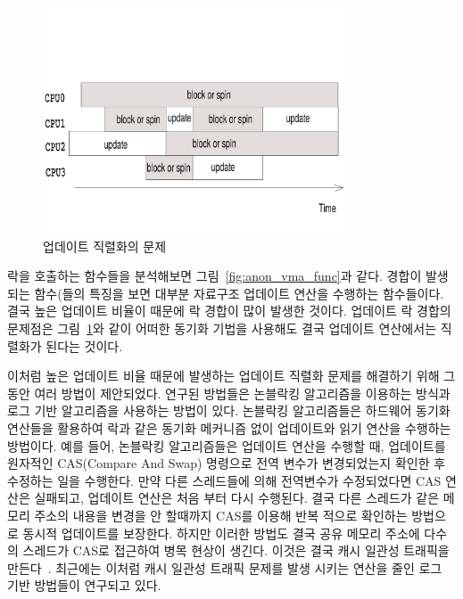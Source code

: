\begin{figure}[h]
    \centering
    \includegraphics[width=0.8\textwidth]{fig/update}
    \caption{업데이트 직렬화의 문제}
    \label{fig:update}
\end{figure}

락을 호출하는 함수들을 분석해보면 그림~\ref{fig:anon_vma_func}과 같다.
경합이 발생되는 함수(들의 
특징을 보면 대부분 자료구조 업데이트 연산을 수행하는 함수들이다. 
결국 높은 업데이트 비율이 때문에 락 경합이 많이 발생한 것이다.
업데이트 락 경합의 문제점은 그림~\ref{fig:update}와 같이 어떠한 동기화 기법을 사용해도 
결국 업데이트 연산에서는 직렬화가 된다는 것이다.

이처럼 높은 업데이트 비율 때문에 발생하는 업데이트 직렬화 문제를 해결하기 위해 그 동안 여러 방법이 
제안되었다. 
연구된 방법들은 논블락킹 알고리즘을 이용하는 
방식과 로그 기반 알고리즘을 사용하는 방법이 있다.
논블락킹 알고리즘들은 하드웨어 동기화 연산들을 활용하여
락과 같은 동기화 메커니즘 없이 업데이트와 읽기 연산을 수행하는 방법이다.
예를 들어, 논블락킹 알고리즘들은 업데이트 연산을 수행할 때, 업데이트를 원자적인 CAS(Compare And Swap) 
명령으로 전역 변수가 변경되었는지 확인한 후 수정하는 일을 수행한다.
만약 다른 스레드들에 의해 전역변수가 수정되었다면 CAS 연산은 실패되고, 업데이트 연산은 
처음 부터 다시 수행된다. 
결국 다른 스레드가 같은 메모리 주소의 내용을 변경을 안 할때까지 CAS를 이용해 반복 적으로 
확인하는 방법으로 동시적 업데이트를 보장한다. 
하지만 이러한 방법도 결국 공유 메모리 주소에 다수의 스레드가 CAS로 접근하여 병목 현상이 생긴다. 
이것은 결국 캐시 일관성 트래픽을 만든다~\cite{SilasBoydWickizerPth}.
최근에는 이처럼 캐시 일관성 트래픽 문제를 발생 시키는 연산을 줄인 로그 기반 방법들이 연구되고 있다.

